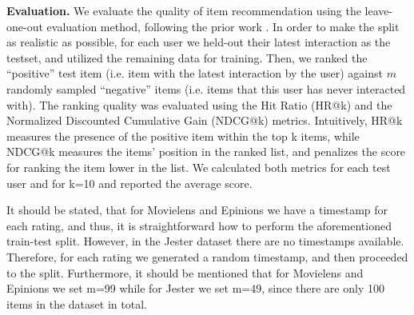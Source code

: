 \textbf{Evaluation.}
We evaluate the quality of item recommendation using the leave-one-out evaluation method, following the prior work \cite{he2017neural,ebesu2018collaborative}.
In order to make the split as realistic as possible, for each user we held-out their latest interaction as the testset, and utilized the remaining data for training.
Then, we ranked the ``positive'' test item (i.e. item with the latest interaction by the user) against $m$ randomly sampled ``negative'' items (i.e. items that this user has never interacted with).
The ranking quality was evaluated using the Hit Ratio (HR@k) and the Normalized Discounted Cumulative Gain (NDCG@k) metrics.
Intuitively, HR@k measures the presence of the positive item within the top k items, while NDCG@k measures the items' position in the ranked list, and penalizes the score for ranking the item lower in the list.
We calculated both metrics for each test user and for k=10 and reported the average score.

It should be stated, that for Movielens and Epinions we have a timestamp for each rating, and thus, it is straightforward how to perform the aforementioned train-test split. 
However, in the Jester dataset there are no timestamps available. 
Therefore, for each rating we generated a random timestamp, and then proceeded to the split. 
Furthermore, it should be mentioned that for Movielens and Epinions we set m=99 while for Jester we set m=49, since there are only 100 items in the dataset in total.

